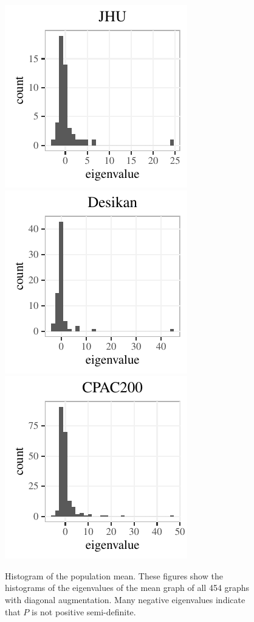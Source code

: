  \begin{figure}
 \centering
 \includegraphics[height=.2\textheight]{./Figures/hist_JHU.pdf} 
 \includegraphics[height=.2\textheight]{./Figures/hist_desikan.pdf} 
 \includegraphics[height=.2\textheight]{./Figures/hist_CPAC200.pdf}
 \caption[Histogram of the population mean]{Histogram of the population mean.
 These figures show the histograms of the eigenvalues of the mean graph of all 454 graphs with diagonal augmentation. Many negative eigenvalues indicate that $P$ is not positive semi-definite.
 }
 \label{fig:LLG_histogram}
 \end{figure}


